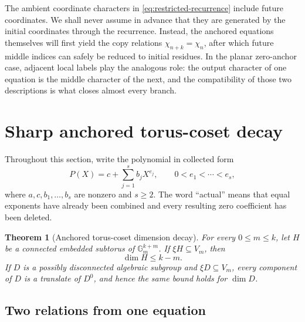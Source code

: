 \documentclass[11pt]{article}
\newtheorem{theorem}{Theorem}[section]
\theoremstyle{definition}
\theoremstyle{remark}
\newcommand{\Gm}{\mathbb{G}_{m}}
\begin{document}
The ambient coordinate characters in \eqref{eq:restricted-recurrence} include
future coordinates.  We shall never assume in advance that they are generated
by the initial coordinates through the recurrence.  Instead, the anchored
equations themselves will first yield the copy relations
$\chi_{n+k}=\chi_n$, after which future middle indices can safely be reduced
to initial residues.  In the planar zero-anchor case, adjacent local labels
play the analogous role: the output character of one equation is the middle
character of the next, and the compatibility of those two descriptions is
what closes almost every branch.

\section{Sharp anchored torus-coset decay}
\label{sec:anchored}

Throughout this section, write the polynomial in collected form
\begin{equation}
P(X)=c+\sum_{j=1}^s b_jX^{e_j},
\qquad 0<e_1<\cdots<e_s,
\label{eq:anchored-P}
\end{equation}
where $a,c,b_1,\ldots,b_s$ are nonzero and $s\geq2$.  The word ``actual'' means that equal exponents have already been combined and every resulting zero coefficient has been deleted.

\begin{theorem}[Anchored torus-coset dimension decay]
\label{thm:anchored}
For every $0\leq m\leq k$, let $H$ be a connected embedded subtorus of
$\Gm^{k+m}$.  If $\xi H\subseteq V_m$, then
\begin{equation}
\dim H\leq k-m.
\label{eq:dimension-bound}
\end{equation}
If $D$ is a possibly disconnected algebraic subgroup and
$\xi D\subseteq V_m$, every component of $D$ is a translate of $D^0$, and hence the same bound holds for $\dim D$.
\end{theorem}

\subsection{Two relations from one equation}
\end{document}
